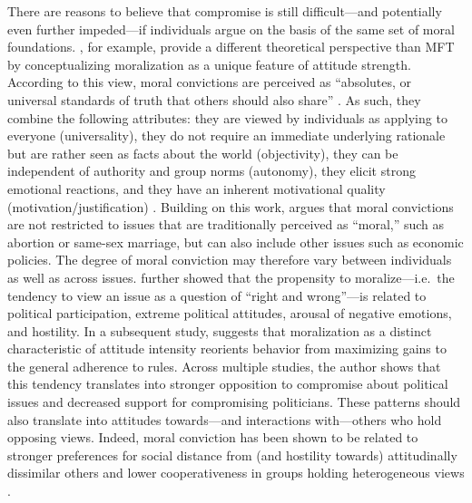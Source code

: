 There are reasons to believe that compromise is still difficult---and potentially even further impeded---if individuals argue on the basis of the same set of moral foundations. \citet{skitka2005moral}, for example, provide a different theoretical perspective than MFT by conceptualizing moralization as a unique feature of attitude strength. According to this view, moral convictions are perceived as ``absolutes, or universal standards of truth that others should also share'' \citep[269]{skitka2010psychology}. As such, they combine the following attributes: they are viewed by individuals as applying to everyone (universality), they do not require an immediate underlying rationale but are rather seen as facts about the world (objectivity), they can be independent of authority and group norms (autonomy), they elicit strong emotional reactions, and they have an inherent motivational quality (motivation/justification) \citep{skitka2010psychology}. Building on this work, \citet{ryan2014reconsidering} argues that moral convictions are not restricted to issues that are traditionally perceived as ``moral,'' such as abortion or same-sex marriage, but can also include other issues such as economic policies. The degree of moral conviction may therefore vary between individuals as well as across issues. \citet{ryan2014reconsidering} further showed that the propensity to moralize---i.e.~the tendency to view an issue as a question of ``right and wrong''---is related to political participation, extreme political attitudes, arousal of negative emotions, and hostility. In a subsequent study, \citet{ryan2016no} suggests that moralization as a distinct characteristic of attitude intensity reorients behavior from maximizing gains to the general adherence to rules. Across multiple studies, the author shows that this tendency translates into stronger opposition to compromise about political issues and decreased support for compromising politicians. These patterns should also translate into attitudes towards---and interactions with---others who hold opposing views. Indeed, moral conviction has been shown to be related to stronger preferences for social distance from (and hostility towards) attitudinally dissimilar others and lower cooperativeness in groups holding heterogeneous views \citep{skitka2005moral}.

